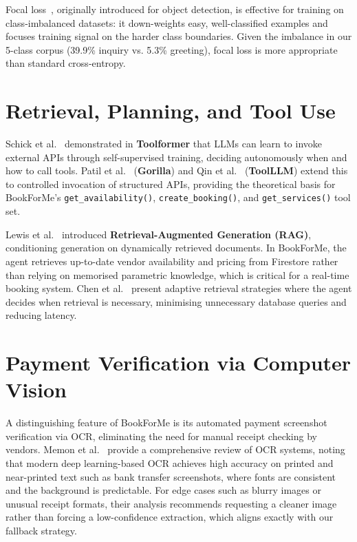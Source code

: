 Focal loss~\cite{lin2017}, originally introduced for object detection, is
effective for training on class-imbalanced datasets: it down-weights easy,
well-classified examples and focuses training signal on the harder class
boundaries. Given the imbalance in our 5-class corpus (39.9\% inquiry vs.
5.3\% greeting), focal loss is more appropriate than standard cross-entropy.

\section{Retrieval, Planning, and Tool Use}
\label{sec:lit-tools}

Schick et al.~\cite{schick2023} demonstrated in \textbf{Toolformer} that LLMs
can learn to invoke external APIs through self-supervised training, deciding
autonomously when and how to call tools. Patil et al.~\cite{patil2023}
(\textbf{Gorilla}) and Qin et al.~\cite{qin2023} (\textbf{ToolLLM}) extend
this to controlled invocation of structured APIs, providing the theoretical
basis for BookForMe's \texttt{get\_availability()},
\texttt{create\_booking()}, and \texttt{get\_services()} tool set.

Lewis et al.~\cite{lewis2020} introduced \textbf{Retrieval-Augmented
Generation (RAG)}, conditioning generation on dynamically retrieved documents.
In BookForMe, the agent retrieves up-to-date vendor availability and pricing
from Firestore rather than relying on memorised parametric knowledge, which is
critical for a real-time booking system. Chen et al.~\cite{chen2025} present
adaptive retrieval strategies where the agent decides when retrieval is
necessary, minimising unnecessary database queries and reducing latency.

\section{Payment Verification via Computer Vision}
\label{sec:lit-ocr}

A distinguishing feature of BookForMe is its automated payment screenshot
verification via OCR, eliminating the need for manual receipt checking by
vendors. Memon et al.~\cite{memon2020} provide a comprehensive review of OCR
systems, noting that modern deep learning-based OCR achieves high accuracy on
printed and near-printed text such as bank transfer screenshots, where fonts
are consistent and the background is predictable. For edge cases such as
blurry images or unusual receipt formats, their analysis recommends requesting
a cleaner image rather than forcing a low-confidence extraction, which aligns
exactly with our fallback strategy.

